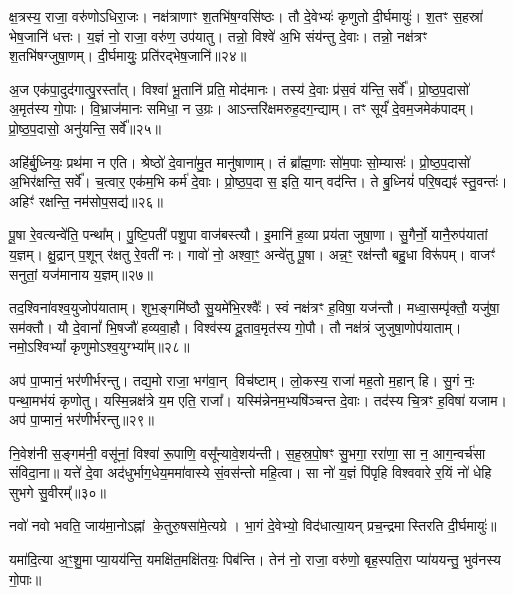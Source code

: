 क्ष॒त्रस्य॒ राजा॒ वरु॑णोऽधिरा॒जः। 
नक्ष॑त्राणाꣳ श॒तभि॑ष॒ग्वसि॑ष्ठः। 
तौ दे॒वेभ्यः॑ कृणुतो दी॒र्घमायुः॑। 
श॒तꣳ स॒हस्रा॑ भेष॒जानि॑ धत्तः। 
य॒ज्ञं नो॒ राजा॒ वरु॑ण॒ उप॑यातु। 
तन्नो॒ विश्वे॑ अ॒भि संय॑न्तु दे॒वाः। 
तन्नो॒ नक्ष॑त्रꣳ श॒तभि॑षग्जुषा॒णम्। 
दी॒र्घमायुः॒ प्रति॑रद्भेष॒जानि॑॥२४॥ 

अ॒ज एक॑पा॒दुद॑गात्पु॒रस्ता᳚त्। 
विश्वा॑ भू॒तानि॑ प्रति॒ मोद॑मानः। 
तस्य॑ दे॒वाः प्र॑स॒वं य॑न्ति॒ सर्वे᳚। 
प्रो॒ष्ठ॒प॒दासो॑ अ॒मृत॑स्य गो॒पाः। 
वि॒भ्राज॑मानः समिधा॒ न उ॒ग्रः। 
आऽन्तरि॑क्षमरुह॒दग॒न्द्याम्। 
तꣳ सूर्यं॑ दे॒वम॒जमेक॑पादम्। 
प्रो॒ष्ठ॒प॒दासो॒ अनु॑यन्ति॒ सर्वे᳚॥२५॥ 

अहि॑र्बु॒ध्नियः॒ प्रथ॑मा न एति। 
श्रेष्ठो॑ दे॒वाना॑मु॒त मानु॑षाणाम्। 
तं ब्रा᳚ह्म॒णाः सो॑म॒पाः सो॒म्यासः॑। 
प्रो॒ष्ठ॒प॒दासो॑ अ॒भिर॑क्षन्ति॒ सर्वे᳚। 
च॒त्वार॒ एक॑म॒भि कर्म॑ दे॒वाः। 
प्रो॒ष्ठ॒प॒दा स॒ इति॒ यान् वद॑न्ति। 
ते बु॒ध्नियं॑ परि॒षद्यꣴ॑ स्तु॒वन्तः॑। 
अहिꣳ॑ रक्षन्ति॒ नम॑सोप॒सद्य॑॥२६॥ 

पू॒षा रे॒वत्यन्वे॑ति॒ पन्था᳚म्। 
पु॒ष्टि॒पती॑ पशु॒पा वाज॑बस्त्यौ। 
इ॒मानि॑ ह॒व्या प्रय॑ता जुषा॒णा। 
सु॒गैर्नो॒ यानै॒रुप॑यातां य॒ज्ञम्। 
क्षु॒द्रान् प॒शून् र॑क्षतु रे॒वती॑ नः। 
गावो॑ नो॒ अश्वा॒ꣳ॒ अन्वे॑तु पू॒षा। 
अन्न॒ꣳ॒ रक्ष॑न्तौ बहु॒धा विरू॑पम्। 
वाजꣳ॑ सनुतां॒ यज॑मानाय य॒ज्ञम्॥२७॥ 

तद॒श्विना॑वश्व॒युजोप॑याताम्। 
शुभ॒ङ्गमि॑ष्ठौ सु॒यमे॑भि॒रश्वैः᳚। 
स्वं नक्ष॑त्रꣳ ह॒विषा॒ यज॑न्तौ। 
मध्वा॒सम्पृ॑क्तौ॒ यजु॑षा॒ सम॑क्तौ। 
यौ दे॒वानां᳚ भि॒षजौ॑ हव्यवा॒हौ। 
विश्व॑स्य दू॒ताव॒मृत॑स्य गो॒पौ। 
तौ नक्ष॑त्रं जुजुषा॒णोप॑याताम्। 
नमो॒ऽश्विभ्यां᳚ कृणुमोऽश्व॒युग्भ्या᳚म्॥२८॥ 

अप॑ पा॒प्मानं॒ भर॑णीर्भरन्तु। 
तद्य॒मो राजा॒ भग॑वा॒न् विच॑ष्टाम्। 
लो॒कस्य॒ राजा॑ मह॒तो म॒हान् हि। 
सु॒गं नः॒ पन्था॒मभ॑यं कृणोतु। 
यस्मि॒न्नक्ष॑त्रे य॒म एति॒ राजा᳚। 
यस्मि॑न्नेनम॒भ्यषि॑ञ्चन्त दे॒वाः। 
तद॑स्य चि॒त्रꣳ ह॒विषा॑ यजाम। 
अप॑ पा॒प्मानं॒ भर॑णीर्भरन्तु॥२९॥ 

नि॒वेश॑नी स॒ङ्गम॑नी॒ वसू॑नां॒ विश्वा॑ रू॒पाणि॒ वसू᳚न्यावे॒शय॑न्ती। 
स॒ह॒स्र॒पो॒षꣳ सु॒भगा॒ ररा॑णा॒ सा न॒ आग॒न्वर्च॑सा संविदा॒ना॥ यत्ते॑ दे॒वा अद॑धुर्भाग॒धेय॒ममा॑वास्ये सं॒वस॑न्तो महि॒त्वा। 
सा नो॑ य॒ज्ञं पि॑पृहि विश्ववारे र॒यिं नो॑ धेहि सुभगे सु॒वीरम्᳚॥३०॥ 

\closesection


नवो॑ नवो भवति॒ जाय॑मा॒नोऽह्नां के॒तुरु॒षसा॑मे॒त्यग्रे।
भा॒गं दे॒वेभ्यो॒ विद॑धात्या॒यन् प्रच॒न्द्रमास्तिरति दी॒र्घमायुः॑॥

यमा॑दि॒त्या अ॒ꣳ॒शु॒माप्या॒यय॑न्ति॒ यमक्षि॑त॒मक्षि॑तयः॒ पिब॑न्ति।
तेन॑ नो॒ राजा॒ वरु॑णो॒ बृह॒स्पति॒रा प्या॑ययन्तु॒ भुव॑नस्य गो॒पाः॥

